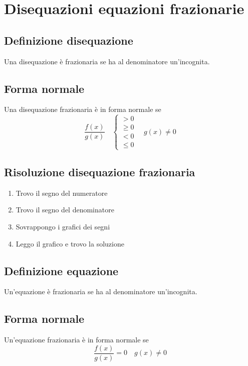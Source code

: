 \chapter{Disequazioni equazioni frazionarie}
\section{Definizione disequazione}
Una disequazione è frazionaria se ha al denominatore un'incognita.
\section{Forma normale}
Una disequazione frazionaria è in forma normale se
\begin{equation}
\dfrac{f(x)}{g(x)}\quad\begin{cases}
>0\\
\geq 0\\
<0\\
\leq 0
\end{cases}\quad g(x)\neq 0
\end{equation}
\section{Risoluzione disequazione frazionaria}
\begin{enumerate}
	\item Trovo il segno del numeratore
	\item Trovo il segno del denominatore
	\item Sovrappongo i grafici dei segni
	\item Leggo il grafico e trovo la soluzione
\end{enumerate}
\section{Definizione equazione}
Un'equazione è frazionaria se ha al denominatore un'incognita.
\section{Forma normale}
Un'equazione frazionaria è in forma normale se
\begin{equation}
\dfrac{f(x)}{g(x)}=0\quad g(x)\neq 0
\end{equation}
